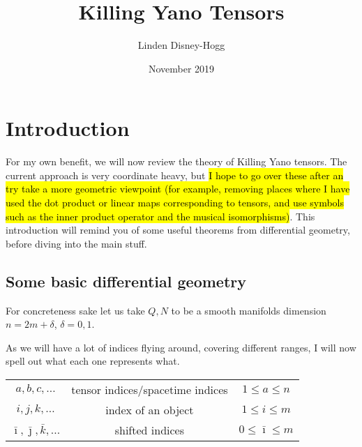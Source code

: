 \documentclass{article}
\title{Killing Yano Tensors}
\author{Linden Disney-Hogg}
\date{November 2019}
\begin{document}
\maketitle
\tableofcontents

\section{Introduction}
For my own benefit, we will now review the theory of Killing Yano tensors. The current approach is very coordinate heavy, but \hl{I hope to go over these after an try take a more geometric viewpoint (for example, removing places where I have used the dot product or linear maps corresponding to tensors, and use symbols such as the inner product operator and the musical isomorphisms)}. This introduction will remind you of some useful theorems from differential geometry, before diving into the main stuff. 

\subsection{Some basic differential geometry}

For concreteness sake let us take $Q,N$ to be a smooth manifolds dimension $n = 2m+\delta$, $\delta = 0,1$.

\begin{notation}
As we will have a lot of indices flying around, covering different ranges, I will now spell out what each one represents what. \\
\begin{center}
\begin{tabular}{ccc}
    $a,b,c,\dots$ & tensor indices/spacetime indices & $1 \leq a \leq n$ \\
    $i,j,k,\dots$ & index of an object & $1 \leq i \leq m$ \\
    $\bar{\imath},\bar{\jmath},\bar{k}, \dots$ & shifted indices & $0 \leq \bar{\imath} \leq m$
\end{tabular}
\end{center}
\end{notation}
\end{document}
